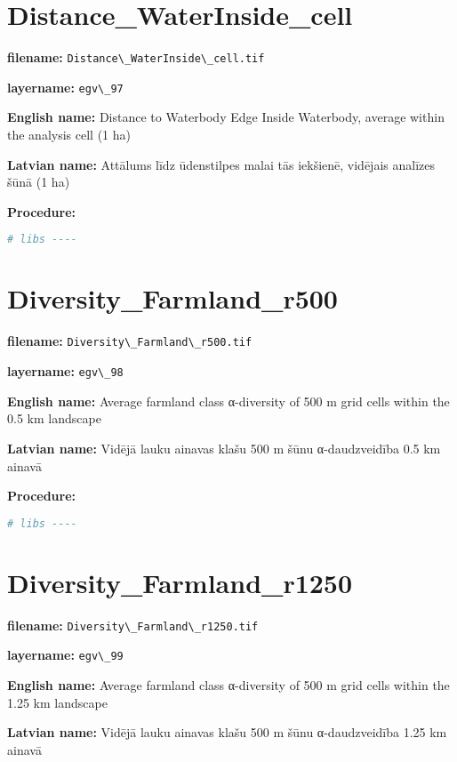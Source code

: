 \documentclass[
]{book}
\newcommand{\passthrough}[1]{#1}
\begin{document}
\section{Distance\_WaterInside\_cell}\label{ch06.097}

\textbf{filename:} \passthrough{\lstinline!Distance\_WaterInside\_cell.tif!}

\textbf{layername:} \passthrough{\lstinline!egv\_97!}

\textbf{English name:} Distance to Waterbody Edge Inside Waterbody, average within the analysis cell (1 ha)

\textbf{Latvian name:} Attālums līdz ūdenstilpes malai tās iekšienē, vidējais analīzes šūnā (1 ha)

\textbf{Procedure:}

\begin{lstlisting}[language=R]
# libs ----
\end{lstlisting}

\section{Diversity\_Farmland\_r500}\label{ch06.098}

\textbf{filename:} \passthrough{\lstinline!Diversity\_Farmland\_r500.tif!}

\textbf{layername:} \passthrough{\lstinline!egv\_98!}

\textbf{English name:} Average farmland class α-diversity of 500 m grid cells within the 0.5 km landscape

\textbf{Latvian name:} Vidējā lauku ainavas klašu 500 m šūnu α-daudzveidība 0.5 km ainavā

\textbf{Procedure:}

\begin{lstlisting}[language=R]
# libs ----
\end{lstlisting}

\section{Diversity\_Farmland\_r1250}\label{ch06.099}

\textbf{filename:} \passthrough{\lstinline!Diversity\_Farmland\_r1250.tif!}

\textbf{layername:} \passthrough{\lstinline!egv\_99!}

\textbf{English name:} Average farmland class α-diversity of 500 m grid cells within the 1.25 km landscape

\textbf{Latvian name:} Vidējā lauku ainavas klašu 500 m šūnu α-daudzveidība 1.25 km ainavā
\end{document}

